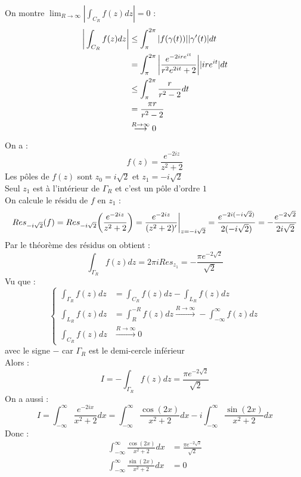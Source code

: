 On montre $\lim_{R \to \infty} |\int_{C_R} f(z) dz| = 0$ :
\begin{align*}
    \bigg{|}\int_{C_R} f(z)dz\bigg{|} &\leq \int_\pi^{2\pi} |f(\gamma(t))||\gamma'(t)|dt \\
    &= \int_\pi^{2\pi} \bigg{|} \frac{e^{-2ire^{it}}}{r^2e^{2it}+2} \bigg{|} |ire^{it}| dt \\
    &\leq \int_\pi^{2\pi} \frac{r}{r^2 - 2} dt \\
    &= \frac{\pi r}{r^2 - 2} \\
    &\overset{R \to \infty}{\longrightarrow} 0
\end{align*}
On a :
$$f(z) = \frac{e^{-2iz}}{z^2+2}$$
Les pôles de $f(z)$ sont $z_0 = i\sqrt{2}$ et $z_1 = -i\sqrt{2}$ \\
Seul $z_1$ est à l'intérieur de $\Gamma_R$ et c'est un pôle d'ordre $1$ \\
On calcule le résidu de $f$ en $z_1$ :
$$Res_{-i\sqrt{2}}(f) = Res_{-i\sqrt{2}}\bigg{(}\frac{e^{-2iz}}{z^2+2}\bigg{)}= \frac{e^{-2iz}}{(z^2+2)'} \bigg{|}_{z=-i\sqrt{2}} = \frac{e^{-2i(-i\sqrt{2})}}{2(-i\sqrt{2})} = -\frac{e^{-2\sqrt{2}}}{2i\sqrt{2}}$$
Par le théorème des résidus on obtient :
$$\int_{\Gamma_R} f(z) dz = 2\pi i Res_{z_1} = -\frac{\pi e^{-2\sqrt{2}}}{\sqrt{2}}$$
Vu que :
$$
\begin{cases}
    \int_{\Gamma_R} f(z) dz &= \int_{C_R} f(z) dz - \int_{L_R} f(z) dz \\
    \int_{L_R} f(z) dz &= \int_{R}^{-R} f(z) dz \overset{R \to \infty}{\longrightarrow} -\int_{-\infty}^{\infty} f(z) dz \\
    \int_{C_R} f(z) dz &\overset{R \to \infty}{\longrightarrow} 0
\end{cases}
$$
avec le signe $-$ car $\Gamma_R$ est le demi-cercle inférieur \\
Alors :
$$I = -\int_{\Gamma_R} f(z) dz = \frac{\pi e^{-2\sqrt{2}}}{\sqrt{2}}$$
On a aussi :
$$I = \int_{-\infty}^{\infty} \frac{e^{-2ix}}{x^2+2}dx = \int_{-\infty}^{\infty} \frac{\cos(2x)}{x^2+2}dx - i \int_{-\infty}^{\infty} \frac{\sin(2x)}{x^2+2}dx$$
Donc :
\begin{align*}
    \int_{-\infty}^{\infty} \frac{\cos(2x)}{x^2+2}dx &= \frac{\pi e^{-2\sqrt{2}}}{\sqrt{2}}\\
    \int_{-\infty}^{\infty} \frac{\sin(2x)}{x^2+2}dx &= 0
\end{align*}
